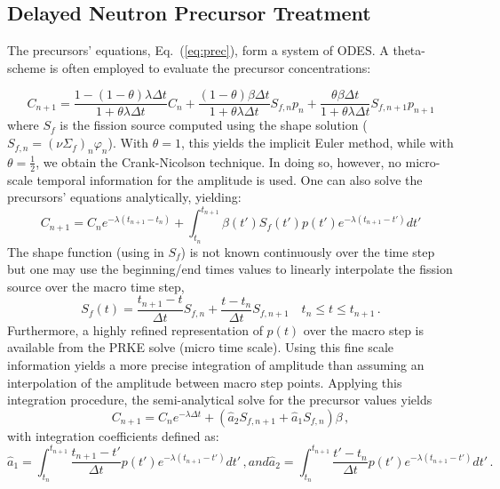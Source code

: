 \documentclass{elsarticle}
\newcommand{\eqt}[1]{Eq.~(\ref{#1})}                     %
\newcommand{\be}{\begin{equation}}
\newcommand{\ee}{\end{equation}}
\begin{document}
\subsection{Delayed Neutron Precursor Treatment}


The precursors' equations, \eqt{eq:prec}, form a system of ODES. %
A theta-scheme is often employed to evaluate the precursor concentrations:

\be
C_{n+1} = \frac{1-(1-\theta) \lambda\Delta t}{1+\theta \lambda\Delta t}C_n + \frac{(1-\theta) \beta\Delta t}{1+\theta \lambda\Delta t}S_{f,n} p_n +  \frac{\theta \beta\Delta t}{1+\theta \lambda\Delta t}S_{f,n+1} p_{n+1}
\label{eq:dnp_theta}
\ee
where $S_f$ is the fission source computed using the shape solution ($S_{f,n}=(\nu\Sigma_f)_n\varphi_n$). With
$\theta=1$, this yields the implicit Euler method, while with $\theta=\tfrac 1 2$, we obtain the Crank-Nicolson technique. In doing so, however, no micro-scale temporal information for the amplitude is used.
One can also solve the precursors' equations analytically, yielding:
\be
C_{n+1} =  C_n e^{-\lambda (t_{n+1} - t_n) }  + \int_{t_n}^{t_{n+1}} \beta(t') S_f(t') p(t')e^{-\lambda (t_{n+1}-t')}dt'
\label{eq:prec_an}
\ee
The shape function (using in $S_f$) is not known continuously over the time step but one may use the beginning/end times values
to linearly interpolate the fission source over the macro time step,
\be
S_f(t) = \frac{t_{n+1}-t}{\Delta t}S_{f,n}  + \frac{t-t_n}{\Delta t}S_{f,n+1}  \quad t_n \le t \le t_{n+1} \,.
\ee
Furthermore, a highly refined representation of $p(t)$ over the macro step is available from the PRKE solve (micro time scale). 
Using this fine scale information yields a more precise integration of amplitude than assuming an interpolation of the amplitude between macro step points.
Applying this integration procedure, the semi-analytical solve for the precursor values yields
\be
C_{n+1} = C_n e^{-\lambda \Delta t} + \left(\hat{a}_2 S_{f,n+1}+\hat{a}_1 S_{f,n}\right)\beta \,,
\label{eq:dnp_an}
\ee
with integration coefficients defined as:
\begin{subequations}
\be
\hat{a}_1= \int_{t_n}^{t_{n+1}}\frac{t_{n+1}-t'}{\Delta t}p(t')e^{-\lambda(t_{n+1}-t')}dt' \,,
\ee
and
\be
\hat{a}_2 = \int_{t_n}^{t_{n+1}}\frac{t'-t_n}{\Delta t}p(t')e^{-\lambda(t_{n+1}-t')}dt'  \,.
\ee
\end{subequations}
\end{document}
